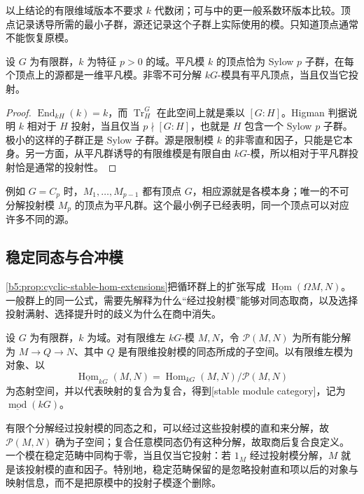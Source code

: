 以上结论的有限维域版本不要求 \(k\) 代数闭；可与\cite[Theorem 11.6.1 and Proposition 11.6.2]{Webb2016FiniteGroupRepresentations}中的更一般系数环版本比较。顶点记录诱导所需的最小子群，源还记录这个子群上实际使用的模。只知道顶点通常不能恢复原模。

\begin{example}\label{b5:exm:trivial-module-vertex}
	设 \(G\) 为有限群，\(k\) 为特征 \(p>0\) 的域。平凡模 \(k\) 的顶点恰为 Sylow \(p\) 子群，在每个顶点上的源都是一维平凡模。非零不可分解 \(kG\)-模具有平凡顶点，当且仅当它投射。
\end{example}
\begin{proof}
	\(\operatorname{End}_{kH}(k)=k\)，而 \(\operatorname{Tr}_H^G\) 在此空间上就是乘以 \([G:H]\)。Higman 判据说明 \(k\) 相对于 \(H\) 投射，当且仅当 \(p\nmid[G:H]\)，也就是 \(H\) 包含一个 Sylow \(p\) 子群。极小的这样的子群正是 Sylow 子群。源是限制模 \(k\) 的非零直和因子，只能是它本身。另一方面，从平凡群诱导的有限维模是有限自由 \(kG\)-模，所以相对于平凡群投射恰是通常的投射性。
\end{proof}

例如 \(G=C_p\) 时，\(M_1,\ldots,M_{p-1}\) 都有顶点 \(G\)，相应源就是各模本身；唯一的不可分解投射模 \(M_p\) 的顶点为平凡群。这个最小例子已经表明，同一个顶点可以对应许多不同的源。

\subsection{稳定同态与合冲模}
\label{b5:subsec:0805:04}

\cref{b5:prop:cyclic-stable-hom-extensions}把循环群上的扩张写成 \(\underline{\operatorname{Hom}}(\Omega M,N)\)。一般群上的同一公式，需要先解释为什么“经过投射模”能够对同态取商，以及选择投射满射、选择提升时的歧义为什么在商中消失。

\begin{definition}\label{b5:def:stable-group-module-category}
	设 \(G\) 为有限群，\(k\) 为域。对有限维左 \(kG\)-模 \(M,N\)，令 \(\mathcal P(M,N)\) 为所有能分解为 \(M\to Q\to N\)、其中 \(Q\) 是有限维投射模的同态所成的子空间。以有限维左模为对象、以
	\[
		\underline{\operatorname{Hom}}_{kG}(M,N)
		=\operatorname{Hom}_{kG}(M,N)/\mathcal P(M,N)
	\]
	为态射空间，并以代表映射的复合为复合，得到[stable module category]，记为 \(\underline{\operatorname{mod}}(kG)\)。
\end{definition}
有限个分解经过投射模的同态之和，可以经过这些投射模的直和来分解，故 \(\mathcal P(M,N)\) 确为子空间；复合任意模同态仍有这种分解，故取商后复合良定义。一个模在稳定范畴中同构于零，当且仅当它投射：若 \(1_M\) 经过投射模分解，\(M\) 就是该投射模的直和因子。特别地，稳定范畴保留的是忽略投射直和项以后的对象与映射信息，而不是把原模中的投射子模逐个删除。

